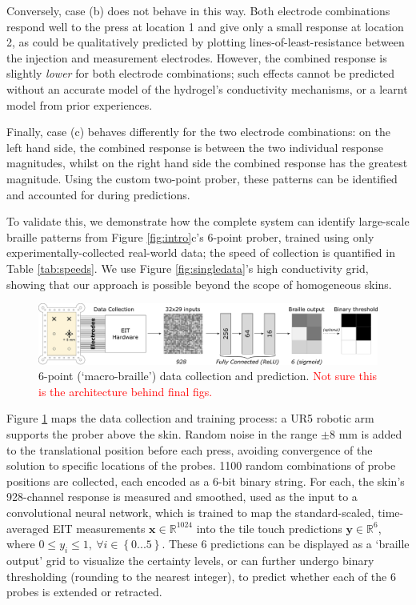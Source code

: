 Conversely, case (b) does not behave in this way. Both electrode combinations respond well to the press at location 1 and give only a small response at location 2, as could be qualitatively predicted by plotting lines-of-least-resistance between the injection and measurement electrodes. However, the combined response is slightly \textit{lower} for both electrode combinations; such effects cannot be predicted without an accurate model of the hydrogel's conductivity mechanisms, or a learnt model from prior experiences.

Finally, case (c) behaves differently for the two electrode combinations: on the left hand side, the combined response is between the two individual response magnitudes, whilst on the right hand side the combined response has the greatest magnitude. Using the custom two-point prober, these patterns can be identified and accounted for during predictions.

To validate this, we demonstrate how the complete system can identify large-scale braille patterns from Figure \ref{fig:intro}c's 6-point prober, trained using only experimentally-collected real-world data; the speed of collection is quantified in Table \ref{tab:speeds}. We use Figure \ref{fig:singledata}'s high conductivity grid, showing that our approach is possible beyond the scope of homogeneous skins.

\begin{figure}[htbp]
  \centering
  \includegraphics[width=0.85\linewidth]{Images/Architecture.pdf}
  \caption{6-point (`macro-braille') data collection and prediction. \textcolor{red}{Not sure this is the architecture behind final figs.}}
  \label{fig:architecture}
\end{figure}

Figure \ref{fig:architecture} maps the data collection and training process: a UR5 robotic arm supports the prober above the skin. Random noise in the range $\pm$8 mm is added to the translational position before each press, avoiding convergence of the solution to specific locations of the probes. 1100 random combinations of probe positions are collected, each encoded as a 6-bit binary string. For each, the skin's 928-channel response is measured and smoothed, used as the input to a convolutional neural network, which is trained to map the standard-scaled, time-averaged EIT measurements $ \mathbf{x} \in \mathbb{R}^{1024} $ into the tile touch predictions $ \mathbf{y} \in \mathbb{R}^{6} $, where $ 0 \leq y_i \leq 1, \ \forall i \in \left \{  0 ... 5\right \} $. These 6 predictions can be displayed as a `braille output' grid to visualize the certainty levels, or can further undergo binary thresholding (rounding to the nearest integer), to predict whether each of the 6 probes is extended or retracted.

